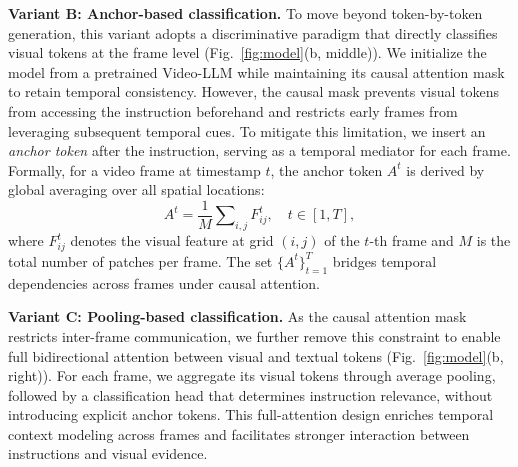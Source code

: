 \noindent\textbf{Variant B: Anchor-based classification.}
To move beyond token-by-token generation, this variant adopts a discriminative paradigm that directly classifies visual tokens at the frame level (Fig.~\ref{fig:model}(b, middle)). 
We initialize the model from a pretrained Video-LLM while maintaining its causal attention mask to retain temporal consistency. 
However, the causal mask prevents visual tokens from accessing the instruction beforehand and restricts early frames from leveraging subsequent temporal cues. 
To mitigate this limitation, we insert an \emph{anchor token} after the instruction, serving as a temporal mediator for each frame.  
Formally, for a video frame at timestamp $t$, the anchor token $A^t$ is derived by global averaging over all spatial locations:
\begin{equation}
A^t = \frac{1}{M}\sum\nolimits_{i,j} F_{ij}^t, \quad t \in [1, T],
\end{equation}
where $F_{ij}^t$ denotes the visual feature at grid $(i,j)$ of the $t$-th frame and $M$ is the total number of patches per frame. 
The set $\{A^t\}_{t=1}^T$ bridges temporal dependencies across frames under causal attention.

\noindent\textbf{Variant C: Pooling-based classification.}
As the causal attention mask restricts inter-frame communication, we further remove this constraint to enable full bidirectional attention between visual and textual tokens (Fig.~\ref{fig:model}(b, right)). 
For each frame, we aggregate its visual tokens through average pooling, followed by a classification head that determines instruction relevance, without introducing explicit anchor tokens.
This full-attention design enriches temporal context modeling across frames and facilitates stronger interaction between instructions and visual evidence.
